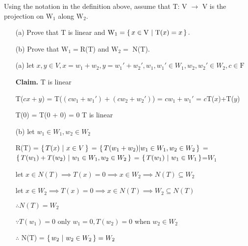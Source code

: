Using the notation in the definition above, assume that T: V $\rightarrow$ V is the projection on $\mathrm{W}_1$ along $\mathrm{W}_2$.

\begin{enumerate}
	\item[(a)] Prove that T is linear and $\mathrm{W}_1 = \left\{ \,x \in \mathrm{V} ~|~ \mathrm{T}(x) = x \,\right\}.$
	\item[(b)] Prove that $\mathrm{W}_1 = $R(T) and $\mathrm{W}_2 =$ N(T).
\end{enumerate}

\begin{tcolorbox}
\begin{solution}
	\begin{enumerate}
		\item[(a)] let $x,y \in V, x = w_1 + w_2, y = w_1'+w_2', w_1,w_1' \in W_1, w_2,w_2' \in W_2, c \in \mathrm{F}$
		
		\textbf{Claim.} T is linear
		
		T($cx + y$) = T($(cw_1 + w_1')+(cw_2 + w_2')$) = $cw_1 + w_1'$ = $c$T($x$)+T($y$)
		
		T(0) = T(0 + 0) = 0
		T is linear
		
		\item[(b)] let $w_1 \in W_1, w_2 \in W_2$
		
		R(T) = $\left\{ \,T(x)~|~x \in V \,\right\}$ = $\left\{ \,T(w_1+w_2)|w_1 \in W_1,w_2 \in W_2 \,\right\}$ = $\left\{ \,T(w_1)+T(w_2)~|~ w_1\in W_1,w_2 \in W_2 \,\right\}$ = $\left\{ \,T(w_1)~|~w_1 \in W_1 \,\right\}$=$W_1$
		
		let $x \in N(T) \implies T(x) = 0 \implies x \in W_2 \implies N(T) \subseteq W_2$
		
		let $x \in W_2 \implies T(x) = 0 \implies x \in N(T) \implies W_2 \subseteq N(T)$
		
		$\therefore N(T) = W_2$		
		
		
		$\because T(w_1)=0$ only $w_1 = 0, T(w_2) = 0$ when $w_2 \in W_2$
		
		$\therefore $ N(T) = $\left\{ \,w_2 ~|~ w_2 \in W_2 \,\right\} = W_2$
	\end{enumerate}
	
\end{solution}

\end{tcolorbox}